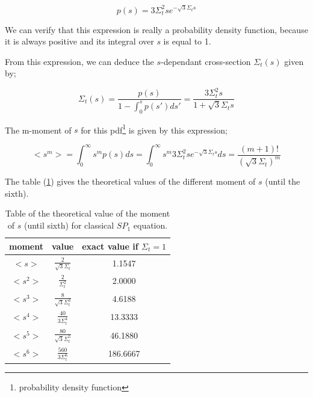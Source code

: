 \documentclass[a4paper, 12pt]{report}
\newcommand{\bl}{\big<}
\newcommand{\bg}{\big>}
\begin{document}
\begin{equation}
p(s) = 3\Sigma_t^2 se^{-\sqrt{3}\Sigma_t s}
\end{equation}

We can verify that this expression is really a probability density function, because it is always positive and its integral over $s$ is equal to 1.

From this expression, we can deduce the $s$-dependant cross-section $\Sigma_t(s)$ given by;

\begin{equation}
\Sigma_t(s) = \frac{p(s)}{1-\int_0^s p(s')ds'} = \frac{3 \Sigma_t^2 s}{1+ \sqrt{3}\Sigma_t s}
\end{equation}

The	m-moment of $s$ for this pdf\footnote{probability density function} is given by this expression;

\begin{equation}
\bl s^m \bg = \int_0^\infty s^m p(s)ds =  \int_0^\infty s^m 3\Sigma_t^2 se^{-\sqrt{3}\Sigma_t s} ds = \frac{(m+1)!}{\left(\sqrt{3}\Sigma_t\right)^m}
\end{equation}

The table (\ref{momentsp1}) gives the theoretical values of the different moment of $s$ (until the sixth).
\begin{center}
\begin{table}
\begin{center}
\begin{tabular}{|c|c|c|}
\hline
moment & value & exact value if $\Sigma_t = 1$ \\ \hline
$\bl s \bg$ &$ \frac{2}{\sqrt{3}\Sigma_t}$ & 1.1547  \\ \hline
$\bl s^2 \bg$ & $\frac{2}{\Sigma_t^2}$ & 2.0000 \\ \hline
$\bl s^3 \bg$ &$ \frac{8}{\sqrt{3}\Sigma_t^3}$ & 4.6188\\ \hline
$\bl s^4 \bg$ &$ \frac{40}{3 \Sigma_t^4}$ & 13.3333\\ \hline
$\bl s^5 \bg$ &$ \frac{80}{\sqrt{3}\Sigma_t^5}$ & 46.1880 \\ \hline
$\bl s^6 \bg$ &$ \frac{560}{3 \Sigma_t^6}$ & 186.6667 \\ \hline
\end{tabular}
\caption{\label{momentsp1} Table of the theoretical value of the moment of $s$ (until sixth) for classical $SP_1$ equation.}
\end{center}
\end{table}
\end{center}
\end{document}
